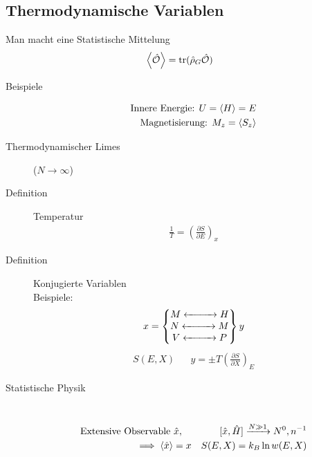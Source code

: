 \documentclass[11pt]{article}
\theoremstyle{plain}
\newcommand{\pd}[2]{\frac{\partial #1 }{\partial #2}}
\newcommand{\trace}{\operatorname{tr}}
\begin{document}
 \subsection*{Thermodynamische Variablen}
 Man macht eine Statistische Mittelung
 \begin{align*}
   \Braket{\hat{\cal{O}}} = \trace (\hat{\rho}_G \hat{\cal{O}})
 \end{align*}
 \begin{description}
   \item[Beispiele] 
     \begin{align*}
      \text{Innere Energie: } U= \Braket{H} = E \\
      \text{Magnetisierung: } M_z = \Braket{S_z} \\
     \end{align*}
   \item[Thermodynamischer Limes] ($N \to \infty$)
   \item[Definition] Temperatur
     \begin{align*}
       \frac{1}{T} = \left( \pd{S}{E} \right)_x
     \end{align*}
   \item[Definition] Konjugierte Variablen \\
     Beispiele: 
     \begin{align*}
       x = \begin{Bmatrix} 
         M \xleftrightarrow{\hspace{1cm}}  H \\ 
         N \xleftrightarrow{\hspace{1cm}}  M \\
         V \xleftrightarrow{\hspace{1cm}} P 
     \end{Bmatrix} y
     \end{align*}
     \begin{align*}
       S(E,X) && y = \pm  T \left( \pd{S}{X} \right)_E
     \end{align*}
   \item[Statistische Physik] $ $ \\
     \begin{align*}
       \text{Extensive Observable } \hat{x}, \quad && [\hat{x}, \hat{H}]
       \xrightarrow{ N \gg 1} N^0, n^{-1} \\
       \implies \Braket{\hat{x}} = x && S(E,X) = k_B \ln{ w(E,X)} \\
     \end{align*}
 \end{description}
\end{document}
